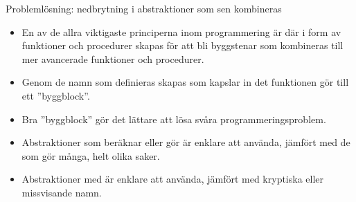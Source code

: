 \documentclass{simpleslides}
\begin{document}
\begin{Slide}{Problemlösning: nedbrytning i abstraktioner som sen kombineras}\SlideFontSmall
\begin{itemize}
\item En av de allra viktigaste principerna inom programmering är  där   i form av funktioner och procedurer skapas för att bli byggstenar som kombineras till mer avancerade funktioner och procedurer.

\item Genom de namn som definieras skapas  som kapslar in det funktionen gör till ett ''byggblock''.

\item Bra ''byggblock'' gör det lättare att lösa svåra programmeringsproblem.

\item Abstraktioner som beräknar eller gör  är enklare att använda, jämfört med de som gör många, helt olika saker.

\item Abstraktioner med  är enklare att använda, jämfört med kryptiska eller missvisande namn.
\end{itemize}

\end{Slide}
\end{document}
